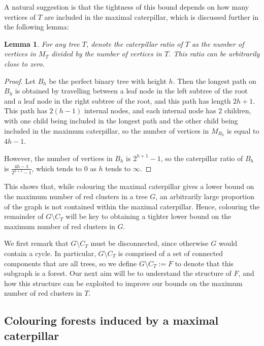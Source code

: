 \documentclass{mpaper}
\newtheorem{lemma}{Lemma}[section]
\begin{document}
A natural suggestion is that the tightness of this bound depends on how many vertices of $T$ are included in the maximal caterpillar, which is discussed further in the following lemma:

\begin{lemma}
  \label{lem/ratio-tends-to-zero}
  For any tree $T$, denote the \emph{caterpillar ratio of $T$} as the number of vertices in $M_T$ divided by the number of vertices in $T$. This ratio can be arbitrarily close to zero.
\end{lemma}

\begin{proof}
Let $B_h$ be the perfect binary tree with height $h$. Then the longest path on $B_h$ is obtained by travelling between a leaf node in the left subtree of the root and a leaf node in the right subtree of the root, and this path has length $2h+1$. This path has $2(h-1)$ internal nodes, and each internal node has 2 children, with one child being included in the longest path and the other child being included in the maximum caterpillar, so the number of vertices in $M_{B_h}$ is equal to $4h-1$.

However, the number of vertices in $B_h$ is $2^{h+1}-1$, so the caterpillar ratio of $B_h$ is $\frac{4h-1}{2^{h+1}-1}$, which tends to $0$ as $h$ tends to $\infty$.
\end{proof}


This shows that, while colouring the maximal caterpillar gives a lower bound on the maximum number of red clusters in a tree $G$, an arbitrarily large proportion of the graph is not contained within the maximal caterpillar. Hence, colouring the remainder of $G \setminus C_T$ will be key to obtaining a tighter lower bound on the maximum number of red clusters in $G$.

We first remark that $G \setminus C_T$ must be disconnected, since otherwise $G$ would contain a cycle. In particular, $G \setminus C_T$ is comprised of a set of connected components that are all trees, so we define $G \setminus C_T := F$ to denote that this subgraph is a forest. Our next aim will be to understand the structure of $F$, and how this structure can be exploited to improve our bounds on the maximum number of red clusters in $T$.

\subsection{Colouring forests induced by a maximal caterpillar}
\label{sub/colouring_forests}
\end{document}
